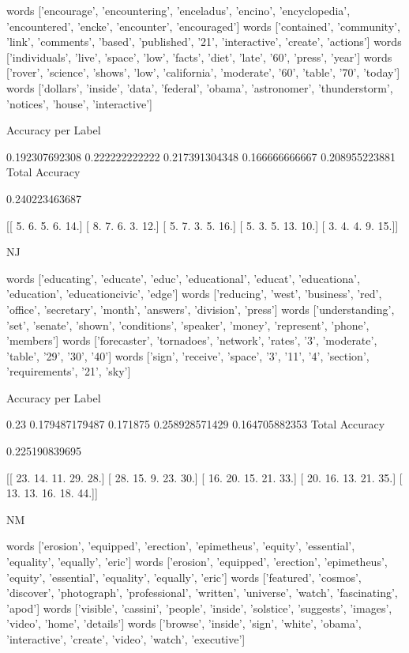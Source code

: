 \documentclass[11pt]{article}
\begin{document}
\begin{verbatium}
words
['encourage', 'encountering', 'enceladus', 'encino', 'encyclopedia', 'encountered', 'encke', 'encounter', 'encouraged']
words
['contained', 'community', 'link', 'comments', 'based', 'published', '21', 'interactive', 'create', 'actions']
words
['individuals', 'live', 'space', 'low', 'facts', 'diet', 'late', '60', 'press', 'year']
words
['rover', 'science', 'shows', 'low', 'california', 'moderate', '60', 'table', '70', 'today']
words
['dollars', 'inside', 'data', 'federal', 'obama', 'astronomer', 'thunderstorm', 'notices', 'house', 'interactive']

Accuracy per Label

0.192307692308
0.222222222222
0.217391304348
0.166666666667
0.208955223881
Total Accuracy

0.240223463687


[[  5.   6.   5.   6.  14.]
 [  8.   7.   6.   3.  12.]
 [  5.   7.   3.   5.  16.]
 [  5.   3.   5.  13.  10.]
 [  3.   4.   4.   9.  15.]]


NJ


words
['educating', 'educate', 'educ', 'educational', 'educat', 'educationa', 'education', 'educationcivic', 'edge']
words
['reducing', 'west', 'business', 'red', 'office', 'secretary', 'month', 'answers', 'division', 'press']
words
['understanding', 'set', 'senate', 'shown', 'conditions', 'speaker', 'money', 'represent', 'phone', 'members']
words
['forecaster', 'tornadoes', 'network', 'rates', '3', 'moderate', 'table', '29', '30', '40']
words
['sign', 'receive', 'space', '3', '11', '4', 'section', 'requirements', '21', 'sky']

Accuracy per Label

0.23
0.179487179487
0.171875
0.258928571429
0.164705882353
Total Accuracy

0.225190839695


[[ 23.  14.  11.  29.  28.]
 [ 28.  15.   9.  23.  30.]
 [ 16.  20.  15.  21.  33.]
 [ 20.  16.  13.  21.  35.]
 [ 13.  13.  16.  18.  44.]]


NM


words
['erosion', 'equipped', 'erection', 'epimetheus', 'equity', 'essential', 'equality', 'equally', 'eric']
words
['erosion', 'equipped', 'erection', 'epimetheus', 'equity', 'essential', 'equality', 'equally', 'eric']
words
['featured', 'cosmos', 'discover', 'photograph', 'professional', 'written', 'universe', 'watch', 'fascinating', 'apod']
words
['visible', 'cassini', 'people', 'inside', 'solstice', 'suggests', 'images', 'video', 'home', 'details']
words
['browse', 'inside', 'sign', 'white', 'obama', 'interactive', 'create', 'video', 'watch', 'executive']


\end{verbatium}
\end{document}
